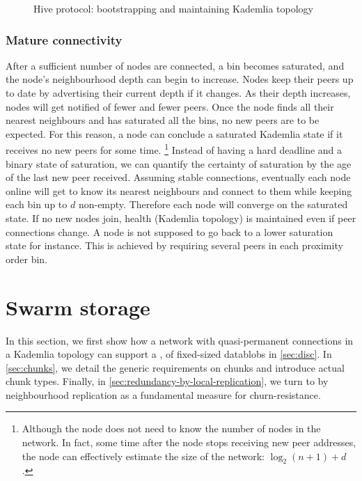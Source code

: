     

\begin{figure}[htbp]
   \centering
   \caption[Hive protocol: bootstrapping and maintaining Kademlia topology \statusred]{Hive protocol: bootstrapping and maintaining Kademlia topology}
   \label{fig:bootstrapping-kademlia}
\end{figure}

\subsubsection{Mature connectivity}

After a sufficient number of nodes are connected, a bin becomes saturated, and the node's neighbourhood depth can begin to increase. Nodes keep their peers up to date by advertising their current depth if it changes. As their depth increases, nodes will get notified of fewer and fewer peers. Once the node finds all their nearest neighbours and has saturated all the bins, no new peers are to be expected. For this reason, a node can conclude a saturated Kademlia state if it receives no new peers for some time.%
%
\footnote{Although the node does not need to know the number of nodes in the network. In fact, some time after the node stops receiving new peer addresses, the node can effectively estimate the size of the network: $\log_2(n+1)+ d$.}
%
Instead of having a hard deadline and a binary state of saturation, we can quantify the certainty of saturation by the age of the last new peer received. Assuming stable connections, eventually each node online will get to know its nearest neighbours and connect to them while keeping each bin up to $d$ non-empty. Therefore each node will converge on the saturated state. If no new nodes join, health (Kademlia topology) is maintained even if peer connections change. A node is not supposed to go back to a lower saturation state for instance. This is achieved by requiring several peers in each proximity order bin. 

\section{Swarm storage\statusgreen}\label{sec:kademlia-storage}

In this section, we first show how a network with quasi-permanent connections in a Kademlia topology can support a ,  of fixed-sized datablobs in \ref{sec:disc}. In \ref{sec:chunks}, we detail the generic requirements on chunks and introduce actual chunk types. Finally, in \ref{sec:redundancy-by-local-replication}, we turn to  by neighbourhood replication as a fundamental measure for churn-resistance.

